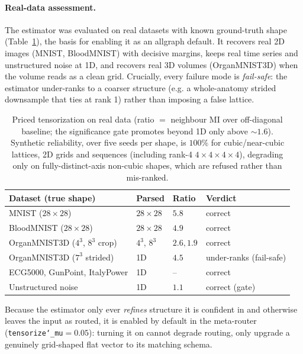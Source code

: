 \documentclass[11pt]{article}
\newcommand{\allowbreakhere}{\discretionary{}{}{}}
\newcommand{\code}[1]{\texttt{\def\_{\char`_\allowbreakhere}#1}}
\begin{document}
\paragraph{Real-data assessment.} The estimator was evaluated on real datasets with known ground-truth
shape (Table~\ref{tab:tensor-real}), the basis for enabling it as an allgraph default. It recovers real
2D images (MNIST, BloodMNIST) with decisive margins, keeps real time series and unstructured noise at 1D,
and recovers real 3D volumes (OrganMNIST3D) when the volume reads as a clean grid. Crucially, every
failure mode is \emph{fail-safe}: the estimator under-ranks to a coarser structure (e.g. a
whole-anatomy strided downsample that ties at rank 1) rather than imposing a false lattice.

\begin{table}[h]
\centering
\small
\renewcommand{\arraystretch}{1.2}
\begin{tabular}{p{4.2cm} p{2.4cm} p{2.4cm} p{2.6cm}}
\toprule
\textbf{Dataset (true shape)} & \textbf{Parsed} & \textbf{Ratio} & \textbf{Verdict}\\
\midrule
MNIST ($28{\times}28$)             & $28{\times}28$   & $5.8$ & correct\\
BloodMNIST ($28{\times}28$)        & $28{\times}28$   & $4.9$ & correct\\
OrganMNIST3D ($4^3$, $8^3$ crop)   & $4^3$, $8^3$     & $2.6,1.9$ & correct\\
OrganMNIST3D ($7^3$ strided)       & 1D               & $4.5$ & under-ranks (fail-safe)\\
ECG5000, GunPoint, ItalyPower      & 1D               & --    & correct\\
Unstructured noise                 & 1D               & $1.1$ & correct (gate)\\
\bottomrule
\end{tabular}
\caption{Priced tensorization on real data (ratio $=$ neighbour MI over off-diagonal baseline; the
significance gate promotes beyond 1D only above ${\sim}1.6$). Synthetic reliability, over five seeds per
shape, is $100\%$ for cubic/near-cubic lattices, 2D grids and sequences (including rank-4 $4{\times}4{\times}4{\times}4$),
degrading only on fully-distinct-axis non-cubic shapes, which are refused rather than mis-ranked.}
\label{tab:tensor-real}
\end{table}

Because the estimator only ever \emph{refines} structure it is confident in and otherwise leaves the
input as routed, it is enabled by default in the meta-router (\code{tensorize\_mu}$=0.05$): turning it on
cannot degrade routing, only upgrade a genuinely grid-shaped flat vector to its matching schema.
\end{document}
